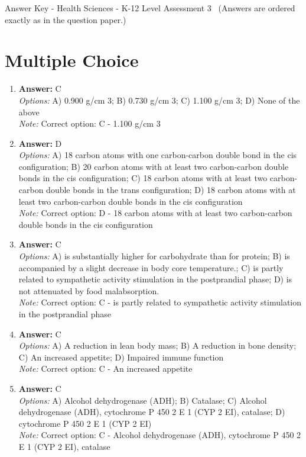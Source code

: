 \documentclass[12pt]{article}
\begin{document}
\begin{center}
Answer Key - Health Sciences - K-12 Level Assessment 3 \
\small (Answers are ordered exactly as in the question paper.)
\end{center}

\section*{Multiple Choice}
\begin{enumerate}[label=\arabic*.]
\item \textbf{Answer:} C
\\ \textit{Options:} A) 0.900 g/cm 3; B) 0.730 g/cm 3; C) 1.100 g/cm 3; D) None of the above
\\ \textit{Note:} Correct option: C - 1.100 g/cm 3
\item \textbf{Answer:} D
\\ \textit{Options:} A) 18 carbon atoms with one carbon-carbon double bond in the cis configuration; B) 20 carbon atoms with at least two carbon-carbon double bonds in the cis configuration; C) 18 carbon atoms with at least two carbon-carbon double bonds in the trans configuration; D) 18 carbon atoms with at least two carbon-carbon double bonds in the cis configuration
\\ \textit{Note:} Correct option: D - 18 carbon atoms with at least two carbon-carbon double bonds in the cis configuration
\item \textbf{Answer:} C
\\ \textit{Options:} A) is substantially higher for carbohydrate than for protein; B) is accompanied by a slight decrease in body core temperature.; C) is partly related to sympathetic activity stimulation in the postprandial phase; D) is not attenuated by food malabsorption.
\\ \textit{Note:} Correct option: C - is partly related to sympathetic activity stimulation in the postprandial phase
\item \textbf{Answer:} C
\\ \textit{Options:} A) A reduction in lean body mass; B) A reduction in bone density; C) An increased appetite; D) Impaired immune function
\\ \textit{Note:} Correct option: C - An increased appetite
\item \textbf{Answer:} C
\\ \textit{Options:} A) Alcohol dehydrogenase (ADH); B) Catalase; C) Alcohol dehydrogenase (ADH), cytochrome P 450 2 E 1 (CYP 2 EI), catalase; D) cytochrome P 450 2 E 1 (CYP 2 EI)
\\ \textit{Note:} Correct option: C - Alcohol dehydrogenase (ADH), cytochrome P 450 2 E 1 (CYP 2 EI), catalase
\end{enumerate}
\end{document}
